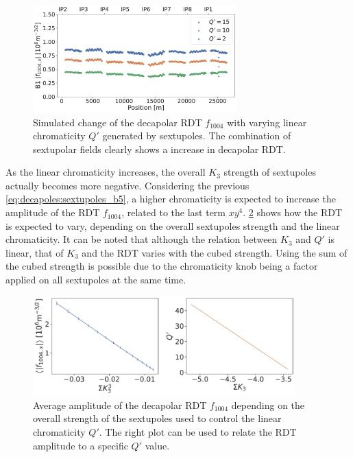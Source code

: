 \begin{figure}[H]
    \centering
    \includegraphics[width=0.7\textwidth]{./images/f1004/f1004_dq.pdf}
    \caption{Simulated change of the decapolar RDT $f_{1004}$ with varying linear
    chromaticity $Q'$ generated by sextupoles. The combination of sextupolar fields clearly shows a 
    increase in decapolar RDT.}
    \label{fig:decapoles:rdts:simulated_f1004_from_sextupoles}
\end{figure}

As the linear chromaticity increases, the overall $K_3$ strength of sextupoles actually becomes 
more negative. Considering the previous \cref{eq:decapoles:sextupoles_b5}, a higher chromaticity
is expected to increase the amplitude of the RDT $f_{1004}$, related to the last term $xy^4$.
\cref{fig:decapoles:sextupoles_k3_f1004} shows how the RDT is expected to vary, depending on the
overall sextupoles strength and the linear chromaticity. It can be noted that although the relation
between $K_3$ and $Q'$ is linear, that of $K_3$ and the RDT varies with the cubed strength. Using 
the sum of the cubed strength is possible due to the chromaticity knob being a factor applied on all
sextupoles at the same time.

\begin{figure}[!htb]
    \centering
    \includegraphics[width=0.9\textwidth]{./images/f1004/avg_f1004_k3.pdf}
    \caption{Average amplitude of the decapolar RDT $f_{1004}$ depending on the overall strength
    of the sextupoles used to control the linear chromaticity $Q'$. The right plot can be used
    to relate the RDT amplitude to a specific $Q'$ value.}
    \label{fig:decapoles:sextupoles_k3_f1004}
\end{figure}


